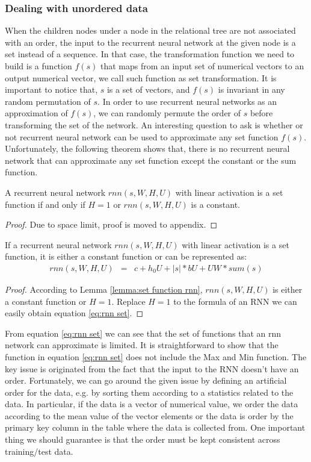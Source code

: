 \subsubsection{Dealing with unordered data}
When the children nodes under a node in the relational tree are not associated with an order, the input to the recurrent neural network at the given node is a set instead of a sequence. In that case, the transformation function we need to build is a function $f(s)$ that maps from an input set of numerical vectors to an output numerical vector, we call such function as set transformation. It is important to notice that, $s$ is a set of vectors, and $f(s)$ is invariant in any random permutation of $s$. 
In order to use recurrent neural networks as an approximation of $f(s)$, we can randomly permute the order of $s$ before transforming the set of the network. An interesting question to ask is whether or not recurrent neural network can be used to approximate any set function $f(s)$. Unfortunately, the following theorem shows that, there is no recurrent neural network that can approximate any set function except the constant or the sum function.
\begin{lemma}
A recurrent neural network $rnn(s, W, H, U)$ with linear activation is a set function if and only if $H=1$ or $rnn(s, W, H, U)$ is a constant.
\label{lemma:set function rnn}
\end{lemma} 
\begin{proof}
Due to space limit, proof is moved to appendix.
\end{proof}

 
 \begin{theorem}
If a recurrent neural network $rnn(s, W, H, U)$ with linear activation is a set function, it is either a constant function or can be represented as: 
\begin{eqnarray}
rnn(s, W, H, U) &=& c + h_0U + |s|*bU + UW*sum(s) 
\label{eq:rnn set}
\end{eqnarray}
\end{theorem} 
\begin{proof}
According to Lemma \ref{lemma:set function rnn}, $rnn(s, W, H, U)$ is either a constant function or $H=1$. Replace $H = 1$ to the formula of an RNN we can easily obtain equation \ref{eq:rnn set}.
\end{proof}
From equation \ref{eq:rnn set} we can see that the set of functions that an rnn network can approximate is limited. It is straightforward to show that the function in equation \ref{eq:rnn set} does not include the Max and Min function. The key issue is originated from the fact that the input to the RNN doesn't have an order. Fortunately, we can go around the given issue by defining  an artificial order for the data, e.g. by sorting them according to a statistics related to the data. In particular, if the data is a vector of numerical value, we order the data according to the mean value of the vector elements or the data is order by the primary key column in the table where the data is collected from. One important thing we should guarantee is that the order must be kept consistent across training/test data.

